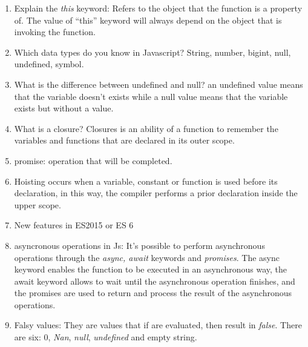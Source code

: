 \begin{multicols}{2}
\begin{enumerate}
\begin{itemize}
\end{itemize}
\item Explain the \emph{this} keyword: Refers to the object that the function is a property of. The value of ``this'' keyword will always depend on the object that is invoking the function.
\item Which data types do you know in Javascript? String, number, bigint, null, undefined, symbol.
\item What is the difference between undefined and null? an undefined value means that the variable doesn't exists while a null value means that the variable exists but without a value.
\item What is a closure? Closures is an ability of a function to remember the variables and functions that are declared in its outer scope.
\item promise: operation that will be completed.
\item Hoisting occurs when a variable, constant or function is used before its declaration, in this way, the compiler performs a prior declaration inside the upper scope.
\item New features in ES2015 or ES 6
\item asyncronous operations in Js: It's possible to perform asynchronous operations through the \emph{async, await} keywords and \emph{promises}. The async keyword enables the function to be executed in an asynchronous way, the await keyword allows to wait until the asynchronous operation finishes, and the promises are used to return and process the result of the asynchronous operations.
\item Falsy values: They are values that if are evaluated, then result in \emph{false}. There are six: $0$, \emph{Nan}, \emph{null}, \emph{undefined} and empty string.
\end{enumerate}
\end{multicols}

